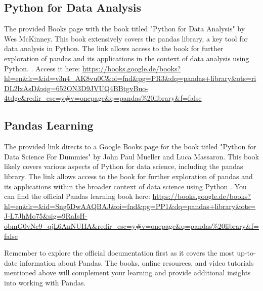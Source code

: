 	\subsection{Python for Data Analysis}
	
	The provided Books page with the book titled "Python for Data Analysis" by Wes McKinney. This book extensively covers the pandas library, a key tool for data analysis in Python. The link allows access to the book for further exploration of pandas and its applications in the context of data analysis using Python. \cite{McKinney:2012}. 
	Access it here: \url{https://books.google.de/books?hl=en&lr=&id=v3n4_AK8vu0C&oi=fnd&pg=PR3&dq=pandas+library&ots=riDL2lxAsD&sig=652ON3D9JVUQ4BBtgvBuo-4tdgc&redir_esc=y#v=onepage&q=pandas%20library&f=false}

	\subsection{Pandas Learning}
	The provided link directs to a Google Books page for the book titled "Python for Data Science For Dummies" by John Paul Mueller and Luca Massaron. This book likely covers various aspects of Python for data science, including the pandas library. The link allows access to the book for further exploration of pandas and its applications within the broader context of data science using Python \cite{Zheng:2018}.
	You can find the official Pandas learning book here: \url{https://books.google.de/books?hl=en&lr=&id=Sng5DwAAQBAJ&oi=fnd&pg=PP1&dq=pandas+library&ots=J-L7JhMo75&sig=9RaIsH-obmG0vNc9_qjL6AnNUHA&redir_esc=y#v=onepage&q=pandas%20library&f=false}

Remember to explore the official documentation first as it covers the most up-to-date information about Pandas. The books, online resources, and video tutorials mentioned above will complement your learning and provide additional insights into working with Pandas.



	
